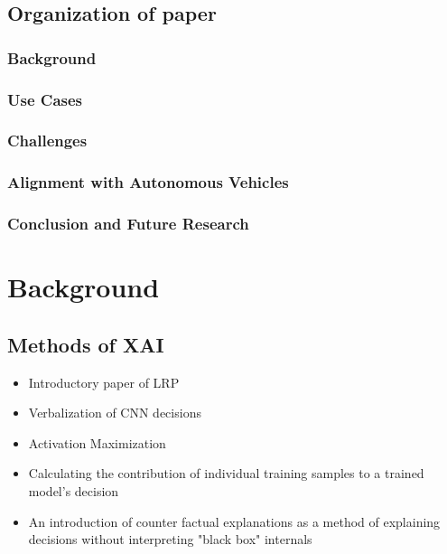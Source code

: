 \documentclass{IEEEtran}
\begin{document}
\subsection{Organization of paper}

\subsubsection{Background}


\subsubsection{Use Cases}

\subsubsection{Challenges}

\subsubsection{Alignment with Autonomous Vehicles}

\subsubsection{Conclusion and Future Research}

\section{Background}

\subsection{Methods of XAI}
\begin{itemize}
    \item Introductory paper of LRP \cite{10.1371/journal.pone.0130140}
    \item Verbalization of CNN decisions \cite{10.1007/978-3-319-46493-0_1}
    \item Activation Maximization \cite{Nguyen2016}
    \item Calculating the contribution of individual training samples to a trained model's decision \cite{Ma2017}
    \item An introduction of counter factual explanations as a method of explaining decisions without interpreting "black box" internals \cite{DBLP:journals/corr/abs-1711-00399}
\end{itemize}
\end{document}
